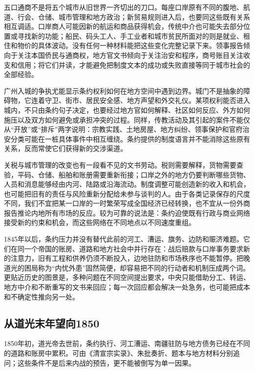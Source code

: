 五口通商不是将五个城市从旧世界一齐切出的刀口。每座口岸原有不同的腹地、航道、行会、仓储、城市管理和地方政治；新贸易规则进入后，也要同这些既有关系相互调适。口岸商人可能因新的航运和商品获得机会，传统中介也可能失去部分位置或寻找新的功能；船民、码头工人、手工业者和城市贫民所面对的则是就业、租住和物价的具体波动。没有任何一种材料能把这些变化完整记录下来。领事报告倾向于关注本国侨民与通商权，地方官文书倾向于关注治安和程序，商号账目关注收支和信用；将它们并读，才能避免把制度文本的成功或失败直接等同于城市社会的全部经验。

广州入城的争执尤能显示条约权利如何在地方空间中遇到边界。城门不是抽象的障碍物，它连着守卫、街市、居民安全感、地方声望和外交礼仪。某项权利能否进入城内，不只由条约句子决定，也要经过地方官如何解释、社区如何反应、外方如何施压以及双方如何避免或承担冲突的过程。同样，传教活动及其引起的案件不能仅从“开放”或“排斥”两字说明：宗教实践、土地房屋、地方纠纷、领事保护和官府治安分类可能在一桩具体事件中相互缠绕。条约提供的制度语言并不能消除这些原有关系，反而常使它们获得新的交涉渠道。

关税与城市管理的改变也有一段看不见的文书劳动。税则需要解释，货物需要查验，平码、仓储、船舶和账册需要重新衔接；口岸之外的地方仍要判断哪些货物、人员和消息能够经由内河、陆路或沿海流动。制度调整可能创造新的收入和机会，也可能把旧有的责任与风险重新分配给未参与谈判的人。由于各类记录保存的尺度不同，我们不宜把某一口岸的一时繁荣写成全国经济已经转换，也不宜从一份外商报告推论内地所有市场的反应。较为可靠的说法是：条约迫使既有行政与商业网络接受新的约束和机会，而这些网络在不同地点以不同速度重组。

1845年以后，条约压力并没有替代此前的河工、漕运、旗务、边防和赈济难题。它们在同一个帝国的账房、道路和地方社会中并行存在：战后赔款与口岸事务要求新的注意力，旧有工程和供养仍须不断投入，边地驻防和市场秩序也不能暂停。把晚道光的困局称为“内忧外患”固然简便，却容易把不同的行动者和机制压成两个词。更贴近历史的图景是，多种问题在不同空间提出要求，中央只能借助分工、转运、地方中介和不断重写的文书来回应；每一次回应都会解决一处急务，也可能把成本和不确定性推向另一处。

\subsection{从道光末年望向1850}

1850年初，道光帝去世前，条约执行、河工漕运、南疆驻防与地方债务已经在不同的道路和账房中累积。可由《清宣宗实录》、朱批奏折、题本与地方材料分别追问；这些条件不是后来内战的预告，更不能被倒写为单一因果。

